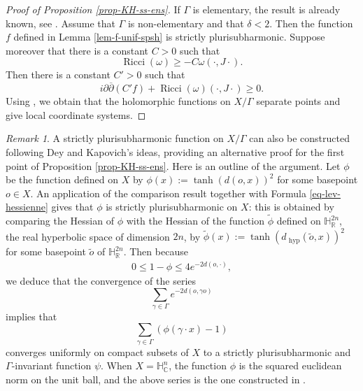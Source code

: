 \documentclass{article}
\theoremstyle{definition}
\theoremstyle{remark}
\newtheorem*{remark}{Remark}
\newcommand{\C}{\mathbb{C}}
\newcommand{\R}{\mathbb{R}}
\newcommand{\HNC}{\mathbb{H}^{n}_{\C}}
\DeclareMathOperator{\Ricci}{\text{Ricci}}
\begin{document}
	\begin{proof}[Proof of Proposition \ref{prop-KH-ss-ens}]
		If $\Gamma$ is elementary, the result is already known, see \cite[Theorem 1.1 and Proposition 1.3]{chenDiscreteGroupsHolomorphic2013}. Assume that $\Gamma$ is non-elementary and that $\delta<2$. Then the function $f$ defined in Lemma \ref{lem-f-unif-spsh} is strictly plurisubharmonic. Suppose moreover that there is a constant $C>0$ such that\begin{equation*}
			\Ricci(\omega)\ge -C\omega(\cdot,J\cdot).
		\end{equation*}
		Then there is a constant $C'>0$ such that\begin{equation*}
			i\partial\overline{\partial}(C'f) + \Ricci(\omega)(\cdot,J\cdot) \ge 0.
		\end{equation*}
		Using \cite[Proposition 4.1]{chenDiscreteGroupsHolomorphic2013}, we obtain that the holomorphic functions on $X/\Gamma$ separate points and give local coordinate systems.
	\end{proof}
	
	\begin{remark}A strictly plurisubharmonic function on $X/\Gamma$ can also be constructed following Dey and Kapovich's ideas, providing an alternative proof for the first point of Proposition \ref{prop-KH-ss-ens}. Here is an outline of the argument. Let $\phi$ be the function defined on $X$ by $\phi(x) :=\tanh(d(o,x))^{2}$ for some basepoint $o\in X$. An application of the comparison result \cite[Theorem A]{greeneFunctionTheoryManifolds1979} together with Formula \eqref{eq-lev-hessienne} gives that $\phi$ is strictly plurisubharmonic on $X$: this is obtained by comparing the Hessian of $\phi$ with the Hessian of the function $\widetilde{\phi}$ defined on $\mathbb{H}^{2n}_{\R}$, the real hyperbolic space of dimension $2n$, by $\widetilde{\phi}(x) := \tanh(d_{\text{ hyp}}(\widetilde{o},x))^{2}$ for some basepoint $\widetilde{o}$ of $\mathbb{H}^{2n}_{\R}$. Then because\begin{align*}
				0\leq 1-\phi \leq 4e^{-2d(o,\cdot)},
			\end{align*}
			we deduce that the convergence of the series \begin{equation*}
				\sum_{\gamma \in \Gamma}e^{-2d(o,\gamma o)}
			\end{equation*} implies that \begin{equation*}
				\sum_{\gamma \in \Gamma}(\phi(\gamma\cdot x)-1)
			\end{equation*} converges uniformly on compact subsets of $X$ to a strictly plurisubharmonic and $\Gamma$-invariant function $\psi$. When $X=\HNC$, the function $\phi$ is the squared euclidean norm on the unit ball, and the above series is the one constructed in \cite{deyNoteComplexhyperbolicKleinian2020}.
		\end{remark}
\end{document}
